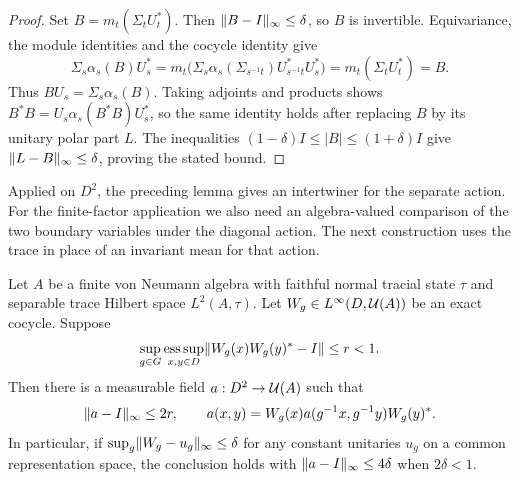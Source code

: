 \begin{proof}
Set $B=m_t(\Sigma_tU_t^*)$.  Then $\lVert B-I\rVert_\infty\le\delta$,
so $B$ is invertible.  Equivariance, the module identities and the
cocycle identity give
\[
 \Sigma_s\alpha_s(B)U_s^*
 =m_t\bigl(\Sigma_s\alpha_s(\Sigma_{s^{-1}t})
               U_{s^{-1}t}^*U_s^*\bigr)
 =m_t(\Sigma_tU_t^*)=B.
\]
Thus $BU_s=\Sigma_s\alpha_s(B)$.  Taking adjoints and products shows
$B^*B=U_s\alpha_s(B^*B)U_s^*$, so the same identity holds after
replacing $B$ by its unitary polar part $L$.  The inequalities
$(1-\delta)I\le|B|\le(1+\delta)I$ give
$\lVert L-B\rVert_\infty\le\delta$, proving the stated bound.
\end{proof}

Applied on $D^2$, the preceding lemma gives an intertwiner for the
separate action.
For the finite-factor application we also need an algebra-valued
comparison of the two boundary variables under the diagonal action.
The next construction uses the trace in place of an invariant mean
for that action.

\begin{lemma}
\label{lem:boundary-diagonal-unitary}
Let $A$ be a finite von Neumann algebra with faithful normal tracial
state $\tau$ and separable trace Hilbert space $L^2(A,\tau)$.
Let $W_g\in L^\infty(D,\mathcal U(A))$ be an exact cocycle.  Suppose
\[
 \sup_{g\in G}\mathop{\rm ess\,sup}_{x,y\in D}
 \lVert W_g(x)W_g(y)^*-I\rVert\le r<1.
\]
Then there is a measurable field $a:D^2\to\mathcal U(A)$ such that
\begin{equation}\label{eq:boundary-diagonal-unitary}
 \lVert a-I\rVert_\infty\le2r,\qquad
 a(x,y)=W_g(x)a(g^{-1}x,g^{-1}y)W_g(y)^*.
\end{equation}
In particular, if $\sup_g\lVert W_g-u_g\rVert_\infty\le\delta$ for any
constant unitaries $u_g$ on a common representation space, the conclusion
holds with $\lVert a-I\rVert_\infty\le4\delta$ when $2\delta<1$.
\end{lemma}

